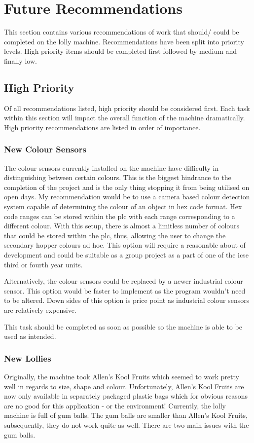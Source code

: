  \section{Future Recommendations}
	This section contains various recommendations of work that should/ could be completed on the lolly machine. Recommendations have been split into priority levels. High priority items should be completed first followed by medium and finally low. 

    \subsection{High Priority}
    Of all recommendations listed, high priority should be considered first. Each task within this section will impact the overall function of the machine dramatically. High priority recommendations are listed in order of importance.
	
        \subsubsection{New Colour Sensors} 
		
            The colour sensors currently installed on the machine have difficulty in distinguishing between certain colours. This is the biggest hindrance to the completion of the project and is the only thing stopping it from being utilised on open days. My recommendation would be to use a camera based colour detection system capable of determining the colour of an object in hex code format. Hex code ranges can be stored within the \acrshort{plc} with each range corresponding to a different colour. With this setup, there is almost a limitless number of colours that could be stored within the \acrshort{plc}, thus, allowing the user to change the secondary hopper colours ad hoc. This option will require a reasonable about of development and could be suitable as a group project as a part of one of the \acrshort{icse} third or fourth year units.
			
			Alternatively, the colour sensors could be replaced by a newer industrial colour sensor. This option would be faster to implement as the program wouldn't need to be altered. Down sides of this option is price point as industrial colour sensors are relatively expensive.
			
			This task should be completed as soon as possible so the machine is able to be used as intended. 
			
       \subsubsection{New Lollies} 
            Originally, the machine took Allen's Kool Fruits which seemed to work pretty well in regards to size, shape and colour. Unfortunately, Allen's Kool Fruits are now only available in separately packaged plastic bags which for obvious reasons are no good for this application - or the environment! Currently, the lolly machine is full of gum balls. The gum balls are smaller than Allen's Kool Fruits, subsequently, they do not work quite as well. There are two main issues with the gum balls.
			

